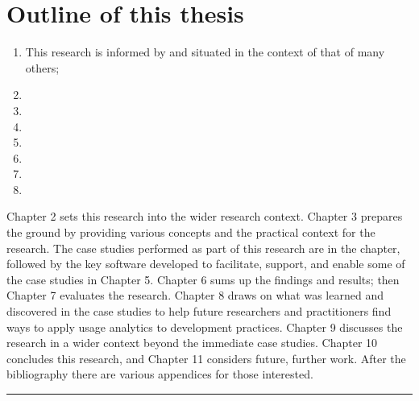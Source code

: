 \section{Outline of this thesis}
\begin{enumerate}
    \item This research is informed by and situated in the context of that of many others;
    \item 
    \item 
    \item 
    \item 
    \item 
    \item 
    \item     
\end{enumerate}
 Chapter 2 sets this research into the wider research context. 
Chapter 3 prepares the ground by providing various concepts and the practical context for the research. 
The case studies performed as part of this research are in the  chapter, followed by the key software developed to facilitate, support, and enable some of the case studies in Chapter 5.
Chapter 6 sums up the findings and results; then Chapter 7 evaluates the research.
Chapter 8 draws on what was learned and discovered in the case studies to help future researchers and practitioners find ways to apply usage analytics to development practices.
Chapter 9 discusses the research in a wider context beyond the immediate case studies.
Chapter 10 concludes this research, and Chapter 11 considers future, further work.
After the bibliography there are various appendices for those interested. 



\par\noindent\rule{\textwidth}{0.4pt}


